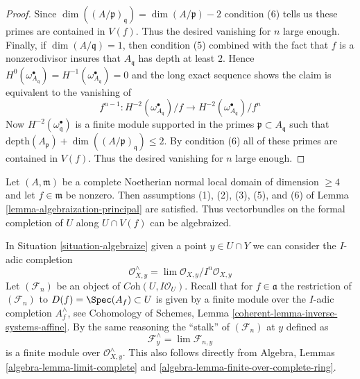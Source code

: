 \begin{proof}
Since $\dim((A/\mathfrak p)_\mathfrak q) = \dim(A/\mathfrak p) - 2$
condition (6) tells us these primes are contained in $V(f)$.
Thus the desired vanishing for $n$ large enough.
Finally, if $\dim(A/\mathfrak q) = 1$, then condition (5) combined
with the fact that $f$ is a nonzerodivisor
insures that $A_\mathfrak q$ has depth at least $2$. Hence
$H^0(\omega_{A_\mathfrak q}^\bullet) =
H^{-1}(\omega_{A_\mathfrak q}^\bullet) = 0$
and the long exact sequence shows the claim is
equivalent to the vanishing of
$$
f^{n - 1} :
H^{-2}(\omega_{A_\mathfrak q}^\bullet)/f \to
H^{-2}(\omega_{A_\mathfrak q}^\bullet)/f^n
$$
Now $H^{-2}(\omega^\bullet_\mathfrak q)$ is a finite
module supported in the primes $\mathfrak p \subset A_\mathfrak q$
such that $\text{depth}(A_\mathfrak p) + \dim((A/\mathfrak p)_\mathfrak q)
\leq 2$. By condition (6) all of these primes are contained in $V(f)$.
Thus the desired vanishing for $n$ large enough.
\end{proof}

\begin{remark}
\label{remark-interesting-case}
Let $(A, \mathfrak m)$ be a complete Noetherian normal local domain
of dimension $\geq 4$ and let $f \in \mathfrak m$ be nonzero.
Then assumptions (1), (2), (3), (5), and (6) of
Lemma \ref{lemma-algebraization-principal}
are satisfied. Thus vectorbundles
on the formal completion of $U$ along $U \cap V(f)$
can be algebraized.
\end{remark}

\noindent
In Situation \ref{situation-algebraize} given a point $y \in U \cap Y$
we can consider the $I$-adic completion
$$
\mathcal{O}_{X, y}^\wedge = \lim \mathcal{O}_{X, y}/I^n\mathcal{O}_{X, y}
$$
Let $(\mathcal{F}_n)$ be an object of $\textit{Coh}(U, I\mathcal{O}_U)$.
Recall that for $f \in \mathfrak a$ the restriction of $(\mathcal{F}_n)$ to
$D(f) = \Spec(A_f) \subset U$ is given by a finite module over the $I$-adic
completion $A_f^\wedge$, see
Cohomology of Schemes, Lemma \ref{coherent-lemma-inverse-systems-affine}.
By the same reasoning the ``stalk'' of $(\mathcal{F}_n)$ at $y$ defined as
$$
\mathcal{F}_y^\wedge = \lim \mathcal{F}_{n, y}
$$
is a finite module over $\mathcal{O}_{X, y}^\wedge$. This also follows directly
from Algebra, Lemmas \ref{algebra-lemma-limit-complete} and
\ref{algebra-lemma-finite-over-complete-ring}.

